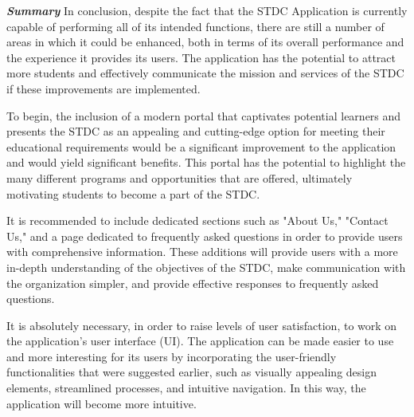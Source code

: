 \begin{justify}
\clearpage




















    \vspace{0.25cm}
    \newendline \textbf{\textit{Summary}}\newendline
        In conclusion, despite the fact that the STDC Application is currently capable of performing all of its intended functions, there are still a number of areas in which it could be enhanced, both in terms of its overall performance and the experience it provides its users. The application has the potential to attract more students and effectively communicate the mission and services of the STDC if these improvements are implemented.

        \vspace{0.25cm}
        \newendline To begin, the inclusion of a modern portal that captivates potential learners and presents the STDC as an appealing and cutting-edge option for meeting their educational requirements would be a significant improvement to the application and would yield significant benefits. This portal has the potential to highlight the many different programs and opportunities that are offered, ultimately motivating students to become a part of the STDC.

        \vspace{0.25cm}
        \newendline It is recommended to include dedicated sections such as "About Us," "Contact Us," and a page dedicated to frequently asked questions in order to provide users with comprehensive information. These additions will provide users with a more in-depth understanding of the objectives of the STDC, make communication with the organization simpler, and provide effective responses to frequently asked questions.

        \vspace{0.25cm}
        \newendline It is absolutely necessary, in order to raise levels of user satisfaction, to work on the application's user interface (UI). The application can be made easier to use and more interesting for its users by incorporating the user-friendly functionalities that were suggested earlier, such as visually appealing design elements, streamlined processes, and intuitive navigation. In this way, the application will become more intuitive.


\end{justify}
